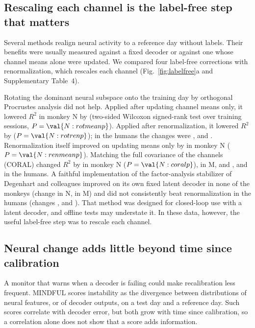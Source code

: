 \documentclass[pdflatex,sn-nature]{sn-jnl}
\begin{document}
\subsection*{Rescaling each channel is the label-free step that matters}

Several methods realign neural activity to a reference day without labels\cite{degenhart2020,gallego2020,ma2023,
karpowicz2025}. Their benefits were usually measured against a fixed decoder or against one whose channel means alone
were updated\cite{ma2023,wilson2025}. We compared four label-free corrections with renormalization, which rescales each
channel (Fig.~\ref{fig:labelfree}a and Supplementary Table~4).

Rotating the dominant neural subspace onto the training day by orthogonal Procrustes analysis\cite{schonemann1966} did
not help. Applied after updating channel means only, it lowered $R^2$ in monkey N by  (two-sided
Wilcoxon signed-rank test over training sessions, $P = \val{N:rotmeanp}$). Applied after renormalization, it lowered $R^2$
by  ($P = \val{N:rotrenp}$); in the humans the changes were ,
 and . Renormalization itself improved on updating means only by
 in monkey N ($P = \val{N:renmeanp}$). Matching the full covariance of the channels (CORAL\cite{sun2016})
changed $R^2$ by  in monkey N ($P = \val{N:coralp}$),  in M, and
,  and  in the humans. A faithful implementation of the
factor-analysis stabilizer of Degenhart and colleagues\cite{degenhart2020} improved on its own fixed latent decoder in
none of the monkeys (change  in N,  in M) and did not consistently beat
renormalization in the humans (changes ,  and ). That method
was designed for closed-loop use with a latent decoder, and offline tests may understate it. In these data, however,
the useful label-free step was to rescale each channel.

\subsection*{Neural change adds little beyond time since calibration}

A monitor that warns when a decoder is failing could make recalibration less frequent. MINDFUL scores instability as
the divergence between distributions of neural features, or of decoder outputs, on a test day and a reference
day\cite{pun2024}. Such scores correlate with decoder error, but both grow with time since calibration, so a
correlation alone does not show that a score adds information.
\end{document}
